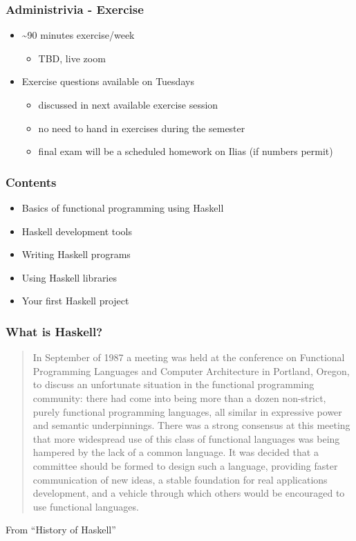 \documentclass{beamer}
\begin{document}
\begin{frame}
  \frametitle{Administrivia - Exercise}
  \begin{itemize}
  \item \~{}90 minutes exercise/week
    \begin{itemize}
    \item TBD, live zoom
    \end{itemize}
  \item Exercise questions available on Tuesdays
    \begin{itemize}
    \item discussed in next available exercise session
    \item no need to hand in exercises during the semester
    \item final exam will be a scheduled homework on Ilias (if numbers
      permit)
    \end{itemize}
  \end{itemize}
\end{frame}



\begin{frame}
  \frametitle{Contents}
  \begin{itemize}
  \item Basics of functional programming using Haskell
  \item Haskell development tools
  \item Writing Haskell programs
  \item Using Haskell libraries
  \item Your first Haskell project
  \end{itemize}
\end{frame}


\begin{frame}
  \frametitle{What is Haskell?}
  \begin{quotation}
    In September of 1987 a meeting was held at the conference on
    Functional Programming Languages and Computer Architecture in
    Portland, Oregon, to discuss an unfortunate situation in the
    functional programming community: there had come into being more
    than a dozen non-strict, purely functional programming languages,
    all similar in expressive power and semantic underpinnings. There
    was a strong consensus at this meeting that more widespread use
    of this class of functional languages was being hampered by the
    lack of a common language. It was decided that a committee should
    be formed to design such a language, providing faster
    communication of new ideas, a stable foundation for real
    applications development, and a vehicle through which others would 
    be encouraged to use functional languages. 
  \end{quotation}
  {\tiny From ``History of Haskell''}
\end{frame}
\end{document}
